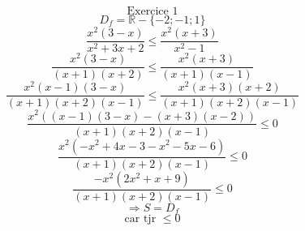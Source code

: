 \documentclass{article}
\begin{document}
\[\text{Exercice 1}\]
\[D_f = \mathbb{R} - \{-2; -1; 1\}\]
\[ \frac{x^2(3-x)}{x^2+3x+2} \leq \frac{x^2(x+3)}{x^2-1} \]
\[ \frac{x^2(3-x)}{(x+1)(x+2)} \leq \frac{x^2(x+3)}{(x+1)(x-1)} \]
\[ \frac{x^2(x-1)(3-x)}{(x+1)(x+2)(x-1)} \leq \frac{x^2(x+3)(x+2)}{(x+1)(x+2)(x-1)}\]
\[ \frac{x^2((x-1)(3-x)-(x+3)(x-2))}{(x+1)(x+2)(x-1)} \leq 0 \]
\[ \frac{x^2(-x^2 + 4x - 3 - x^2 - 5x - 6)}{(x+1)(x+2)(x-1)} \leq 0 \]
\[ \frac{-x^2(2x^2 + x + 9)}{(x+1)(x+2)(x-1)} \leq 0 \]
\[\Rightarrow S = D_f\]
\[\text{car tjr \(\leq 0\)}\]
\end{document}
